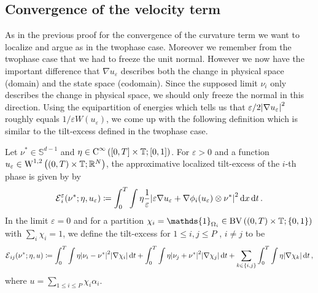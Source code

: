 \subsection{Convergence of the velocity term}

As in the previous proof for the convergence of the curvature term we want to 
localize and argue as in the twophase case. Moreover we remember from the 
twophase case that we had to freeze the unit normal. However we now have the 
important difference that $ \nabla u_{ \varepsilon } $ describes both the 
change in physical space (domain) and the state space (codomain). Since the 
supposed limit $ \nu_{ i } $ only describes the change in physical space, we 
should only freeze the normal in this direction. Using the equipartition of 
energies  which tells us that $ 
\varepsilon / 2 \abs{ \nabla u_{ \varepsilon } }^{ 2 } $ roughly equals $ 1 / 
\varepsilon W ( u_{ \varepsilon } ) $, we come up with the following definition 
which is similar to the tilt-excess defined in the twophase case.

\begin{definition}
	Let $ \nu^{ \ast } \in \mathbb{ S }^{ d - 1 } $ and $ \eta \in \operatorname{C}^{ 
		\infty } \left( [ 0 , T ] \times \operatorname{\mathbb{T}} ; [ 0 , 1 ] \right) $. For 
		$ 
	\varepsilon > 0 $ and a function $ u_{ \varepsilon } \in \operatorname{W}^{ 1 , 2 } 
	\left( ( 0 , T ) \times \operatorname{\mathbb{T}} ; \mathbb{ R }^{ N } \right) $, the 
	approximative localized tilt-excess of the $ i$-th phase is given by by
	\begin{equation*}
		\tilt_excess_{ i }^{ \varepsilon } ( \nu^{ \ast } ; \eta , u_{ 
			\varepsilon } )
		\coloneqq
		\int_{ 0 }^{ T }
		\int
		\eta
		\frac{ 1 }{ \varepsilon }
		\abs{ 
			\varepsilon \nabla u_{ \varepsilon } 
			+
			\nabla \phi_{ i } ( u_{ \varepsilon } ) 
			\otimes
			\nu^{ \ast }
		}^{ 2 }
		\dd{ x }
		\dd{ t }.
	\end{equation*}
	In the limit $ \varepsilon = 0 $ and for a partition 
	$ \chi_{ i } = \mathds{ 1 }_{ \Omega_{ i } } \in \bv \left(
	( 0 , T ) \times \flattorus ; \{ 0 , 1 \} 
	\right) $
	with $ \sum_{ i } \chi_{ i } = 1 $,
	we define the tilt-excess for $ 1 \leq i, j \leq P $ , $ i \neq j $ to be
	\begin{equation*}
		\tilt_excess_{ i j } ( \nu^{ \ast } ; \eta , u ) 
		\coloneqq
		\int_{ 0 }^{ T }
		\int
		\eta
		\abs{ \nu_{ i } - \nu^{ \ast } }^{ 2 }
		\abs{ \nabla \chi_{ i } }
		\dd{ t }
		+
		\int_{ 0 }^{ T }
		\int
		\eta
		\abs{ \nu_{ j } + \nu^{ \ast } }^{ 2 }
		\abs{ \nabla \chi_{ j } }
		\dd{ t }
		+
		\sum_{ k \in \{ i , j \} }
		\int_{ 0 }^{ T }
		\int
		\eta 
		\abs{ \nabla \chi_{ k } }
		\dd{ t },
	\end{equation*}
	where $ u = \sum_{ 1 \leq i \leq P } \chi_{ i } \alpha_{ i } $.
\end{definition}

